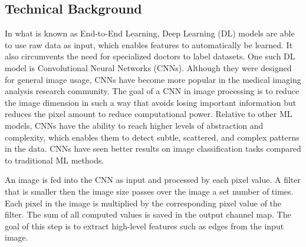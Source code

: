 \documentclass[10pt,twocolumn]{article}
\begin{document}
\subsection{Technical Background}

In what is known as End-to-End Learning, Deep Learning (DL) models are able to use raw data as input, which enables features to automatically be learned. It also circumvents the need for specialized doctors to label datasets. One such DL model is Convolutional Neural Networks (CNNs). Although they were designed for general image usage, CNNs have become more popular in the medical imaging analysis research community. The goal of a CNN in image processing is to reduce the image dimension in such a way that avoids losing important information but reduces the pixel amount to reduce computational power. Relative to other ML models, CNNs have the ability to reach higher levels of abstraction and complexity, which enables them to detect subtle, scattered, and complex patterns in the data. CNNs have seen better results on image classification tasks compared to traditional ML methods.

An image is fed into the CNN as input and processed by each pixel value. A filter that is smaller then the image size passes over the image a set number of times. Each pixel in the image is multiplied by the corresponding pixel value of the filter. The sum of all computed values is saved in the output channel map. The goal of this step is to extract high-level features such as edges from the input image. 
\end{document}
